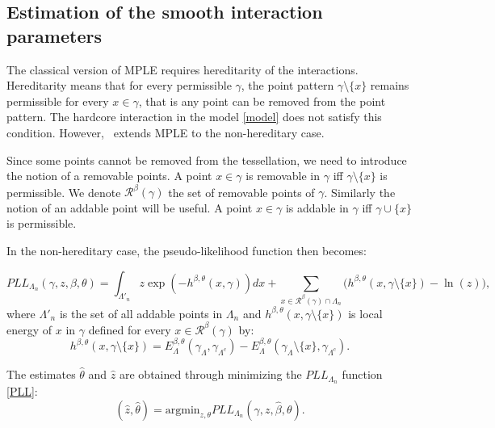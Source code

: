 \subsection{Estimation of the smooth interaction parameters}


The classical version of MPLE requires hereditarity of the interactions. Hereditarity means that for every permissible $\gamma$, the point pattern $\gamma\setminus\{x\}$ remains permissible for every $x\in\gamma$, that is any point can be removed from the point pattern. The hardcore interaction in the model \ref{model} does not satisfy this condition. However,~\cite{DL07} extends MPLE to the non-hereditary case. 

Since some points cannot be removed from the tessellation, we need to introduce the notion of a removable points. A point $x\in\gamma$ is removable in $\gamma$ iff $\gamma\setminus\{x\}$ is permissible. We denote $\mathcal R^\beta(\gamma)$ the set of removable points of $\gamma$. Similarly the notion of an addable point will be useful. A point $x\in\gamma$ is addable in $\gamma$ iff $\gamma \cup \{x\}$ is permissible.


In the non-hereditary case, the pseudo-likelihood function then becomes:

\begin{equation}\label{PLL}
PLL_{\Lambda_n}(\gamma,z,\beta, \theta) = \int_{\Lambda'_n} z \exp (-h^{\beta,\theta}(x,\gamma)) dx + \sum_{x\in\mathcal R^\beta(\gamma)\cap \Lambda_n} \big(h^{\beta,\theta}(x,\gamma\setminus\{x\}) - \ln(z)\big),
\end{equation}
where $\Lambda'_n$ is the set of all addable points in $\Lambda_n$ and $h^{\beta,\theta}(x, \gamma \setminus \{x\})$ is local energy of $x$ in $\gamma$ defined for every $x\in\mathcal R^\beta(\gamma)$ by:
$$h^{\beta,\theta}(x, \gamma \setminus \{x\}) = E^{\beta,\theta}_\Lambda(\gamma_\Lambda, \gamma_{\Lambda^c}) - E^{\beta,\theta}_\Lambda(\gamma_\Lambda\setminus\{x\}, \gamma_{\Lambda^c}).$$

The estimates $\hat\theta$ and $\hat z$ are obtained through minimizing the $PLL_{\Lambda_n}$ function \ref{PLL}:
$$(\hat z, \hat\theta) = \text{argmin}_{z,\theta} PLL_{\Lambda_n} (\gamma, z, \hat\beta,\theta).$$

